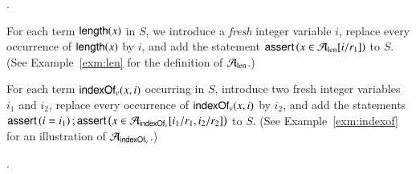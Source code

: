 \medskip
{}.

\smallskip


For each term $\mathsf{length}(x)$ in $S$, we introduce a \emph{fresh} integer variable $i$, replace every occurrence of $\mathsf{length}(x)$ by $i$, and add the statement $\textsf{assert}\left(x \in \mathcal{A}_{\rm len}[i/r_1]\right)$ to $S$. (See Example~\ref{exm:len} for the definition of $\mathcal{A}_{\rm len}$.)  

For each term $\mathsf{indexOf}_v(x, i)$ occurring in $S$, introduce two fresh integer variables $i_1$ and $i_2$, replace every occurrence of $\mathsf{indexOf}_v(x, i)$ by $i_2$, and add the statements $\textsf{assert}\left(i=i_1\right); \textsf{assert}\left(x \in \mathcal{A}_{\mathsf{indexOf}_v}[i_1/r_1, i_2/r_2]\right)$ to $S$.  (See Example~\ref{exm:indexof} for an illustration of $\mathcal{A}_{\rm \mathsf{indexOf}_v}$.)

%
%

\medskip
{}.

\smallskip

